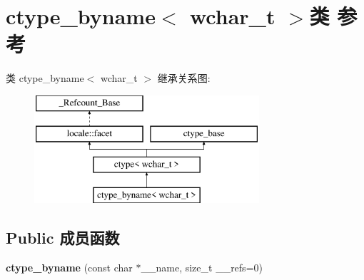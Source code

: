 \hypertarget{classctype__byname_3_01wchar__t_01_4}{}\section{ctype\+\_\+byname$<$ wchar\+\_\+t $>$类 参考}
\label{classctype__byname_3_01wchar__t_01_4}
类 ctype\+\_\+byname$<$ wchar\+\_\+t $>$ 继承关系图\+:\begin{figure}[H]
\begin{center}
\leavevmode
\includegraphics[height=4.000000cm]{classctype__byname_3_01wchar__t_01_4}
\end{center}
\end{figure}
\subsection*{Public 成员函数}
\begin{DoxyCompactItemize}
\item 
\mbox{\label{classctype__byname_3_01wchar__t_01_4_ae09a78747358329a21e85395872b3087}} 
{\bfseries ctype\+\_\+byname} (const char $\ast$\+\_\+\+\_\+name, size\+\_\+t \+\_\+\+\_\+refs=0)
\end{DoxyCompactItemize}
